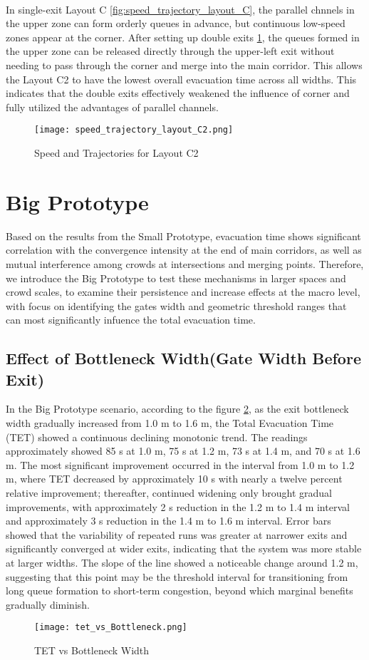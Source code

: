 \\In single-exit Layout C \ref{fig:speed_trajectory_layout_C}, the parallel chnnels in the upper zone can form orderly queues in advance, but continuous low-speed zones appear at the corner. After setting up double exits \ref{fig:speed_trajectory_layout_C2}, the queues formed in the upper zone can be released directly through the upper-left exit without needing to pass through the corner and merge into the main corridor. This allows the Layout C2 to have the lowest overall evacuation time across all widths. This indicates that the double exits effectively weakened the influence of corner and fully utilized the advantages of parallel channels.
\begin{figure}[h]
    \texttt{[image: speed\_trajectory\_layout\_C2.png]}
    \caption{Speed and Trajectories for Layout C2}\label{fig:speed_trajectory_layout_C2}
\end{figure}

\section{Big Prototype}
Based on the results from the Small Prototype, evacuation time shows significant correlation with the convergence intensity at the end of main corridors, as well as mutual interference among crowds at intersections and merging points. Therefore, we introduce the Big Prototype to test these mechanisms in larger spaces and crowd scales, to examine their persistence and increase effects at the macro level, with focus on identifying the gates width and geometric threshold ranges that can most significantly infuence the total evacuation time.
\subsection{Effect of Bottleneck Width(Gate Width Before Exit)}
In the Big Prototype scenario, according to the figure \ref{fig:tet_vs_Bottleneck}, as the exit bottleneck width gradually increased from 1.0 m to 1.6 m, the Total Evacuation Time (TET) showed a continuous declining monotonic trend. The readings approximately showed 85 s at 1.0 m, 75 s at 1.2 m, 73 s at 1.4 m, and 70 s at 1.6 m. The most significant improvement occurred in the interval from 1.0 m to 1.2 m, where TET decreased by approximately 10 s with nearly a twelve percent relative improvement; thereafter, continued widening only brought gradual improvements, with approximately 2 s reduction in the 1.2 m to 1.4 m interval and approximately 3 s reduction in the 1.4 m to 1.6 m interval. Error bars showed that the variability of repeated runs was greater at narrower exits and significantly converged at wider exits, indicating that the system was more stable at larger widths. The slope of the line showed a noticeable change around 1.2 m, suggesting that this point may be the threshold interval for transitioning from long queue formation to short-term congestion, beyond which marginal benefits gradually diminish.
\begin{figure}[h]
    \centering
    \texttt{[image: tet\_vs\_Bottleneck.png]}
    \caption{TET vs Bottleneck Width}
    \label{fig:tet_vs_Bottleneck}
\end{figure}

